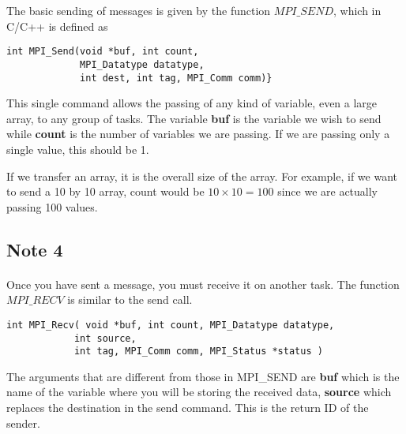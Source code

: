 \documentclass[%
oneside,                 %
final,                   %
10pt]{article}
\begin{document}
The basic sending of messages is given by the function $MPI\_SEND$, which in C/C++
is defined as 




\begin{verbatim}
int MPI_Send(void *buf, int count, 
             MPI_Datatype datatype, 
             int dest, int tag, MPI_Comm comm)}

\end{verbatim}

This single command allows the passing of any kind of variable, even a large array, to any group of tasks. 
The variable \textbf{buf} is the variable we wish to send while \textbf{count}
is the  number of variables we are passing. If we are passing only a single value, this should be 1. 

If we transfer an array, it is  the overall size of the array. 
For example, if we want to send a 10 by 10 array, count would be $10\times 10=100$ 
since we are  actually passing 100 values.



\subsection*{Note 4}

\paragraph{}

Once you have  sent a message, you must receive it on another task. The function $MPI\_RECV$
is similar to the send call.




\begin{verbatim}
int MPI_Recv( void *buf, int count, MPI_Datatype datatype, 
            int source, 
            int tag, MPI_Comm comm, MPI_Status *status )

\end{verbatim}


The arguments that are different from those in MPI\_SEND are
\textbf{buf} which  is the name of the variable where you will  be storing the received data, 
\textbf{source} which  replaces the destination in the send command. This is the return ID of the sender.
\end{document}
